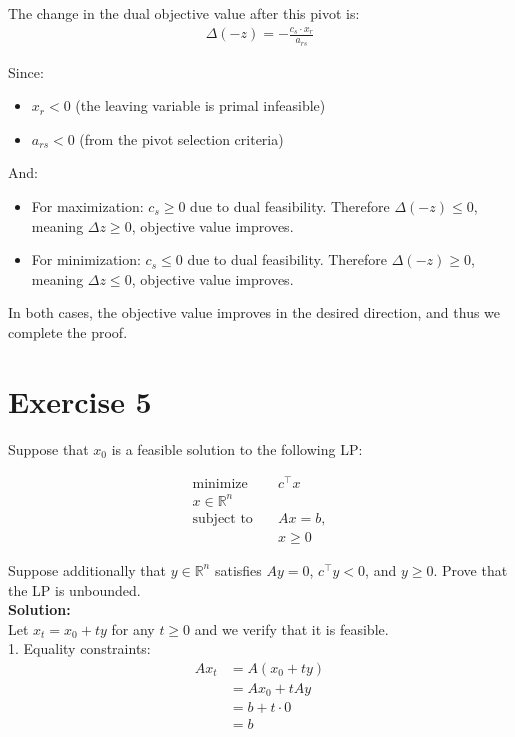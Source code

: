 \documentclass{article}
\begin{document}
The change in the dual objective value after this pivot is:
\begin{align*}
\Delta (-z) = -\frac{c_s \cdot x_r}{a_{rs}}
\end{align*}

Since:
\begin{itemize}
    \item $x_r < 0$ (the leaving variable is primal infeasible)
    \item $a_{rs} < 0$ (from the pivot selection criteria)
\end{itemize}

And:
\begin{itemize}
    \item For maximization: $c_s \geq 0$ due to dual feasibility. Therefore $\Delta (-z) \leq 0$, meaning $\Delta z \geq 0$, objective value improves.
    \item For minimization: $c_s \leq 0$ due to dual feasibility. Therefore $\Delta (-z) \geq 0$, meaning $\Delta z \leq 0$, objective value improves.
\end{itemize}

In both cases, the objective value improves in the desired direction, and thus we complete the proof.

\newpage

\section*{Exercise 5}
Suppose that $x_0$ is a feasible solution to the following LP:

\begin{align*}
\text{minimize} \quad & c^\top x\\
x \in \mathbb{R}^n \quad & \\
\text{subject to} \quad & Ax = b,\\
& x \geq 0
\end{align*}

Suppose additionally that $y \in \mathbb{R}^n$ satisfies $Ay = 0$, $c^\top y < 0$, and $y \geq 0$. Prove that the LP is unbounded. \\

\textbf{Solution:} \\

Let $x_t = x_0 + ty$ for any $t \geq 0$ and we verify that it is feasible. \\

1. Equality constraints:
   \begin{align*}
   Ax_t &= A(x_0 + ty)\\
   &= Ax_0 + tAy\\
   &= b + t \cdot 0\\
   &= b
   \end{align*}
\end{document}
